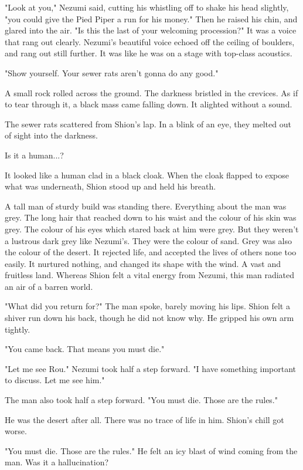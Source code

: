 "Look at you," Nezumi said, cutting his whistling off to shake his head
slightly, "you could give the Pied Piper a run for his money." Then he
raised his chin, and glared into the air. "Is this the last of your
welcoming procession?" It was a voice that rang out clearly. Nezumi's
beautiful voice echoed off the ceiling of boulders, and rang out still
further. It was like he was on a stage with top-class acoustics.

"Show yourself. Your sewer rats aren't gonna do any good."

A small rock rolled across the ground. The darkness bristled in the
crevices. As if to tear through it, a black mass came falling down. It
alighted without a sound.

The sewer rats scattered from Shion's lap. In a blink of an eye, they
melted out of sight into the darkness.

Is it a human...?

It looked like a human clad in a black cloak. When the cloak flapped to
expose what was underneath, Shion stood up and held his breath.

A tall man of sturdy build was standing there. Everything about the man
was grey. The long hair that reached down to his waist and the colour of
his skin was grey. The colour of his eyes which stared back at him were
grey. But they weren't a lustrous dark grey like Nezumi's. They were the
colour of sand. Grey was also the colour of the desert. It rejected
life, and accepted the lives of others none too easily. It nurtured
nothing, and changed its shape with the wind. A vast and fruitless land.
Whereas Shion felt a vital energy from Nezumi, this man radiated an air
of a barren world.

"What did you return for?" The man spoke, barely moving his lips. Shion
felt a shiver run down his back, though he did not know why. He gripped
his own arm tightly.

"You came back. That means you must die."

"Let me see Rou." Nezumi took half a step forward. "I have something
important to discuss. Let me see him."

The man also took half a step forward. "You must die. Those are the
rules."

He was the desert after all. There was no trace of life in him. Shion's
chill got worse.

"You must die. Those are the rules." He felt an icy blast of wind coming
from the man. Was it a hallucination?

